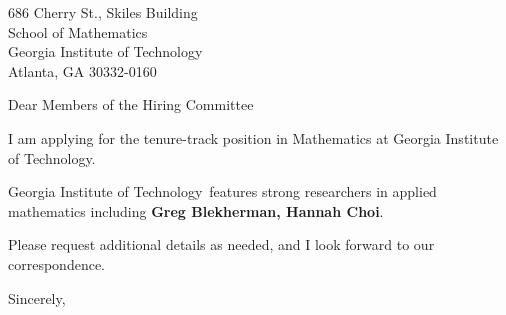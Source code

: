 




	
	
	\def\School{Georgia Institute of Technology}
	
	\begin{letter}
		{686 Cherry St., Skiles Building\\
			School of Mathematics\\
			Georgia Institute of Technology\\
			Atlanta, GA 30332-0160
		}
		
		\opening{Dear Members of the Hiring Committee}
		
		
		I am applying for the tenure-track position in Mathematics at \School. 
		
		\School~features strong researchers in applied mathematics including \textbf{Greg Blekherman, Hannah Choi}. 
		
		
		
		
		
		Please request additional details as needed, and I look forward to our correspondence.
		
		\closing{Sincerely,}
	\end{letter}
